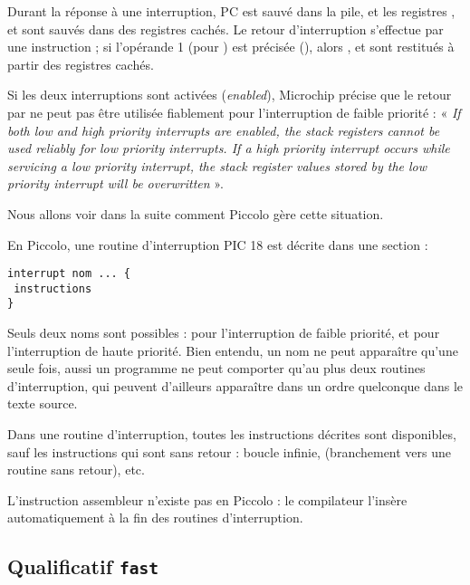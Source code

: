 Durant la réponse à une interruption, PC est sauvé dans la pile, et les registres ,  et  sont sauvés dans des registres cachés. Le retour d’interruption s’effectue par une instruction  ; si l’opérande 1 (pour ) est précisée (), alors ,  et  sont restitués à partir des registres cachés.

Si les deux interruptions sont activées (\emph{enabled}), Microchip précise que le retour par  ne peut pas être utilisée fiablement pour l’interruption de faible priorité : « \emph{If both low and high priority interrupts are enabled, the stack registers cannot be used reliably for low priority interrupts. If a high priority interrupt occurs while servicing a low priority interrupt, the stack register values stored by the low priority interrupt will be overwritten} ».

Nous allons voir dans la suite comment Piccolo gère cette situation.

En Piccolo, une routine d’interruption PIC 18 est décrite dans une section  :

\begin{lstlisting}[language=piccolo]
interrupt nom ... {
 instructions
}
\end{lstlisting}

Seuls deux noms sont possibles :  pour l’interruption de faible priorité, et  pour l’interruption de haute priorité. Bien entendu, un nom ne peut apparaître qu’une seule fois, aussi un programme ne peut comporter qu'au plus deux routines d'interruption, qui peuvent d'ailleurs apparaître dans un ordre quelconque dans le texte source.

Dans une routine d'interruption, toutes les instructions décrites sont disponibles, sauf les instructions qui sont sans retour : boucle infinie,  (branchement vers une routine sans retour), etc.

L’instruction assembleur  n’existe pas en Piccolo : le compilateur l’insère automatiquement à la fin des routines d’interruption.



\subsection{Qualificatif \texttt{fast}}

